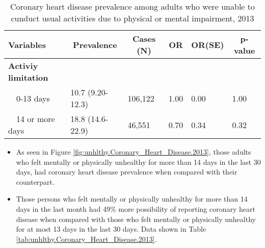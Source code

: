 \begin{table}[H]
\caption{Coronary heart disease prevalence among adults who were unable to cunduct usual activities due to physical or mental impairment, 2013\label{tab:poor.Coronary_Heart_Disease.2013}} 
\begin{center}
\begin{tabular}{llllll}
\hline\hline
\multicolumn{1}{l}{Variables}&\multicolumn{1}{c}{Prevalence}&\multicolumn{1}{c}{Cases (N)}&\multicolumn{1}{c}{OR}&\multicolumn{1}{c}{OR(SE)}&\multicolumn{1}{c}{p-value}\tabularnewline
\hline
{\bfseries Activiy limitation}&&&&&\tabularnewline
~~0-13 days&10.7 (9.20-12.3)&106,122&1.00&0.00&1.00\tabularnewline
~~14 or more days&18.8 (14.6-22.9)& 46,551&0.70&0.34&0.32\tabularnewline
\hline
\end{tabular}\end{center}

\end{table}


\newpage
\begin{itemize}

\item As seen in Figure \ref{fig:unhlthy.Coronary_Heart_Disease.2013}, those adults who felt mentally or physically unhealthy for more than 14 days in the last 30 days, had  
coronary heart disease prevalence when compared with their counterpart.


\item Those persons who felt mentally or physically unhealthy for more than 14 days in the last month had 49\% more possibility of reporting coronary heart disease when compared with those who felt mentally or physically unhealthy for at most 13 days in the last 30 days. Data shown in Table \ref{tab:unhlthy.Coronary_Heart_Disease.2013}.

\end{itemize}

